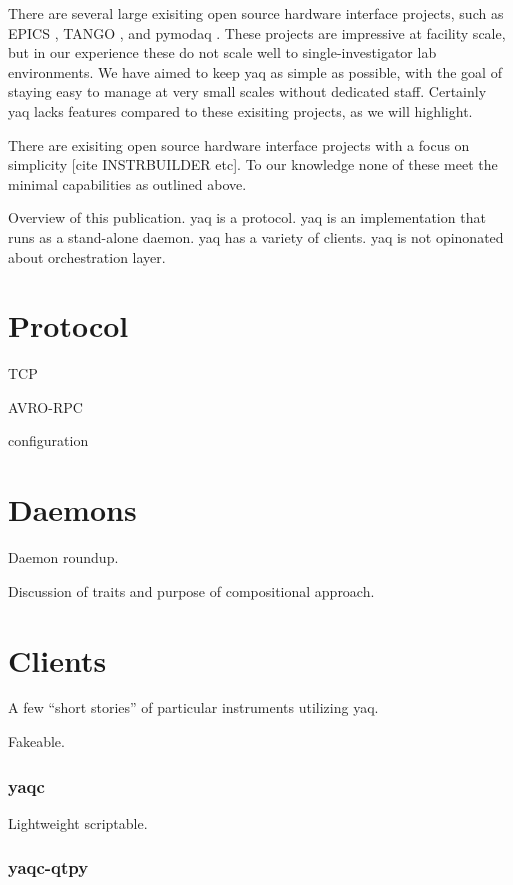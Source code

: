\documentclass{article}
\begin{document}
There are several large exisiting open source hardware interface projects, such as EPICS \cite{DalesioLR1991a}, TANGO \cite{tango-controls.org}, and pymodaq \cite{WeberSebastien2021a}.
These projects are impressive at facility scale, but in our experience these do not scale well to single-investigator lab environments.
We have aimed to keep yaq as simple as possible, with the goal of staying easy to manage at very small scales without dedicated staff.
Certainly yaq lacks features compared to these exisiting projects, as we will highlight.

There are exisiting open source hardware interface projects with a focus on simplicity [cite INSTRBUILDER etc].
To our knowledge none of these meet the minimal capabilities as outlined above.

Overview of this publication.
yaq is a protocol.
yaq is an implementation that runs as a stand-alone daemon.
yaq has a variety of clients.
yaq is not opinonated about orchestration layer.

\section{Protocol}

TCP

AVRO-RPC

configuration

\section{Daemons}

Daemon roundup.

Discussion of traits and purpose of compositional approach.

\section{Clients}

A few ``short stories'' of particular instruments utilizing yaq.

Fakeable.

\subsubsection{yaqc}

Lightweight scriptable.

\subsubsection{yaqc-qtpy}
\end{document}

